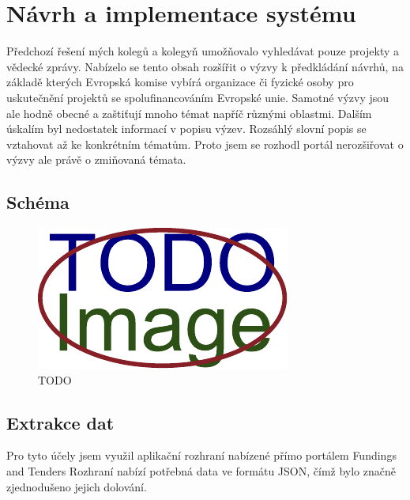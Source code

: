 \chapter{Návrh a implementace systému}
Předchozí řešení mých kolegů a kolegyň umožňovalo vyhledávat pouze projekty a vědecké zprávy. Nabízelo se tento obsah rozšířit o výzvy k předkládání návrhů, na základě kterých Evropská komise vybírá organizace či fyzické osoby pro uskutečnění projektů se spolufinancováním Evropské unie.
Samotné výzvy jsou ale hodně obecné a zaštiťují mnoho témat napříč různými oblastmi. Dalším úskalím byl nedostatek informací v popisu výzev. Rozsáhlý slovní popis se vztahovat až ke konkrétním tématům. Proto jsem se rozhodl portál nerozšiřovat o výzvy ale právě o zmiňovaná témata.

\section{Schéma}
\begin{figure}[H]
	\centering
	\includegraphics[width=\textwidth]{obrazky-figures/placeholder.pdf}
	\caption{TODO}
	\label{mvc}
\end{figure}

\blindtext[2]

\section{Extrakce dat}
\blindtext
Pro tyto účely jsem využil aplikační rozhraní nabízené přímo portálem Fundings and Tenders %
Rozhraní nabízí potřebná data ve formátu JSON, čímž bylo značně zjednodušeno jejich dolování.

